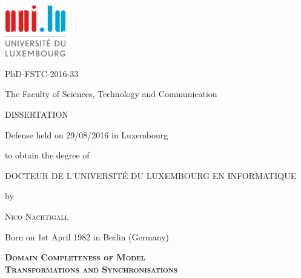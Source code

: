 \thispagestyle{empty}
\begin{minipage}{\textwidth}
    \centering
    \vspace*{-.5cm}
    \includegraphics[width=0.2\textwidth]{logo.png}\par
    \vspace*{0.5cm}
    PhD-FSTC-2016-33\par
    The Faculty of Sciences, Technology and Communication\par 
    \vspace*{1cm}
    \uppercase{\LARGE{Dissertation}}\par
    \vspace*{.5cm}
    \normalsize{Defense held on 29/08/2016 in Luxembourg}\par
    \normalsize{to obtain the degree of}\par
    \vspace*{.5cm}
    \uppercase{\Large{Docteur de L\'{}universit\'e du Luxembourg en Informatique}}\par
    \vspace*{.5cm}
    \normalsize{by}\par
    \Large{\textsc{Nico Nachtigall}}\par
    \vspace*{.5cm}
    \normalsize{Born on 1st April 1982 in Berlin (Germany)}\par

    \color{headlineColor}
    \LARGE{\textsc{\textbf{\sffamily
    Domain Completeness of Model\\ Transformations and Synchronisations
    }}}\par
    \color{black}


\end{minipage}
